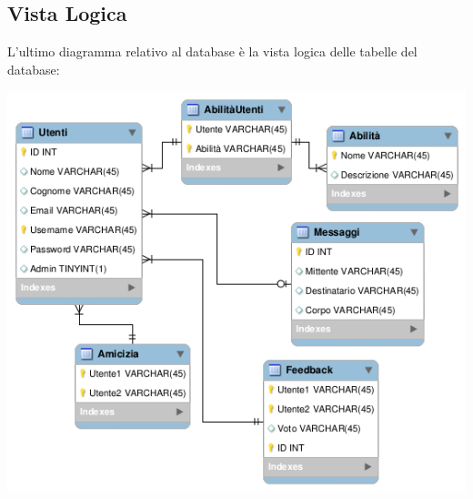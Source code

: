 \subsection{Vista Logica}
L'ultimo diagramma relativo al database è la vista logica delle tabelle del database:
\begin{center}
 \includegraphics[width=1\columnwidth]{logico.png}
\end{center}